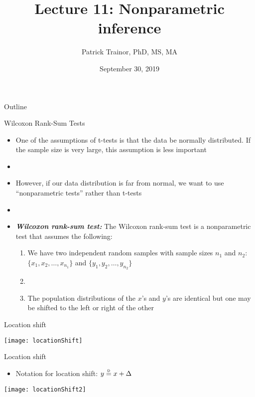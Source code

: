 \documentclass[xcolor=dvipsnames]{beamer}
\title[Lecture 11]{Lecture 11: Nonparametric inference}
\author[Patrick Trainor]{Patrick Trainor, PhD, MS, MA}
\institute[NMSU]{New Mexico State University}
\date{September 30, 2019}
\newcommand\myeq{\mathrel{\overset{\makebox[0pt]{\mbox{\normalfont\tiny\sffamily D}}}{=}}}
\begin{document}
\begin{frame}
\maketitle
\end{frame}

\begin{frame}{Outline}
\tableofcontents[hideallsubsections]
\end{frame}

\begin{frame}{Wilcoxon Rank-Sum Tests}
	\begin{itemize}
		\item One of the assumptions of t-tests is that the data be normally distributed. If the sample size is very large, this assumption is less important
		\item[]
		\item However, if our data distribution is far from normal, we want to use ``nonparametric tests'' rather than t-tests
		\item[]
		\item \textbf{\emph{Wilcoxon rank-sum test:}} The Wilcoxon rank-sum test is a nonparametric test that assumes the following:
		
		\begin{enumerate}
			\item We have two independent random samples with sample sizes $n_1$ and $n_2$: $\{x_1, x_2, \hdots, x_{n_1}\}$ and $\{y_1, y_2, \hdots, y_{n_2}\}$
			\item[]
			\item The population distributions of the $x$'s and $y$'s are identical but one may be shifted to the left or right of the other
		\end{enumerate}
	\end{itemize}
\end{frame}

\begin{frame}{Location shift}
	\begin{center}
		\texttt{[image: locationShift]}
	\end{center}
\end{frame}

\begin{frame}{Location shift}
	\begin{itemize}
		\item Notation for location shift: $y \myeq x + \Delta$
	\end{itemize}
\begin{center}
	\texttt{[image: locationShift2]}
\end{center}
\end{frame}
\end{document}
